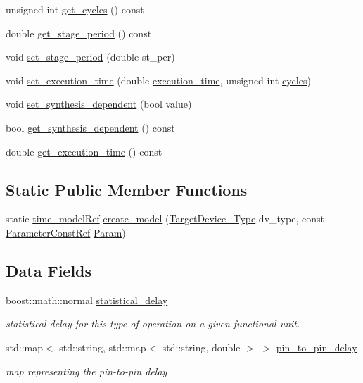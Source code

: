 \begin{DoxyCompactItemize}
\item 
unsigned int \hyperlink{classtime__model_af230e6b138686c1a759bdaeae3efeec8}{get\+\_\+cycles} () const
\item 
double \hyperlink{classtime__model_a7283fa75e6f6dc3bfa8e4c579d56f656}{get\+\_\+stage\+\_\+period} () const
\item 
void \hyperlink{classtime__model_a77760cc70901f92295314797e5a50ba1}{set\+\_\+stage\+\_\+period} (double st\+\_\+per)
\item 
void \hyperlink{classtime__model_a7bdad7b4a8221d4e5e00286e38084de1}{set\+\_\+execution\+\_\+time} (double \hyperlink{classtime__model_a7b02cefe3b48c07b9bf06e70e1333afa}{execution\+\_\+time}, unsigned int \hyperlink{classtime__model_a0589dea91b7289451931e24629a4ba66}{cycles})
\item 
void \hyperlink{classtime__model_a481cdb29f6fd68bc79d6d25adf916c9a}{set\+\_\+synthesis\+\_\+dependent} (bool value)
\item 
bool \hyperlink{classtime__model_a45cff932d6a65cc0fa68ac30b2222c19}{get\+\_\+synthesis\+\_\+dependent} () const
\item 
double \hyperlink{classtime__model_ab4f348d14a35c9ff8f35a6f5d65aa04c}{get\+\_\+execution\+\_\+time} () const
\end{DoxyCompactItemize}
\subsection*{Static Public Member Functions}
\begin{DoxyCompactItemize}
\item 
static \hyperlink{time__model_8hpp_ae203bb7faf1c278333f76fcc6ebe412c}{time\+\_\+model\+Ref} \hyperlink{classtime__model_a91cd4bf13a96b80a8168281a95a34eca}{create\+\_\+model} (\hyperlink{target__device_8hpp_a476becc690220f0805ce73006449c732}{Target\+Device\+\_\+\+Type} dv\+\_\+type, const \hyperlink{Parameter_8hpp_a37841774a6fcb479b597fdf8955eb4ea}{Parameter\+Const\+Ref} \hyperlink{classtime__model_adfd18786156118b7467cef8117933674}{Param})
\end{DoxyCompactItemize}
\subsection*{Data Fields}
\begin{DoxyCompactItemize}
\item 
boost\+::math\+::normal \hyperlink{classtime__model_a43b9fc3be5b91ce6158883eee3497f50}{statistical\+\_\+delay}
\begin{DoxyCompactList}\small\item\em statistical delay for this type of operation on a given functional unit. \end{DoxyCompactList}\item 
std\+::map$<$ std\+::string, std\+::map$<$ std\+::string, double $>$ $>$ \hyperlink{classtime__model_a2472845d03d52d99457ec10a95359715}{pin\+\_\+to\+\_\+pin\+\_\+delay}
\begin{DoxyCompactList}\small\item\em map representing the pin-\/to-\/pin delay \end{DoxyCompactList}\end{DoxyCompactItemize}
